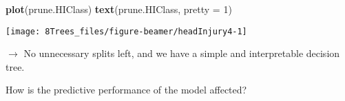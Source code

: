 \documentclass[10pt,ignorenonframetext,]{beamer}
\newenvironment{Shaded}{\begin{snugshade}}{\end{snugshade}}
\newcommand{\DataTypeTok}[1]{\textcolor[rgb]{0.13,0.29,0.53}{#1}}
\newcommand{\DecValTok}[1]{\textcolor[rgb]{0.00,0.00,0.81}{#1}}
\newcommand{\KeywordTok}[1]{\textcolor[rgb]{0.13,0.29,0.53}{\textbf{#1}}}
\newcommand{\NormalTok}[1]{#1}
\begin{document}
\begin{frame}[fragile]

\scriptsize

\begin{Shaded}
\begin{Highlighting}[]
\KeywordTok{plot}\NormalTok{(prune.HIClass)}
\KeywordTok{text}\NormalTok{(prune.HIClass, }\DataTypeTok{pretty =} \DecValTok{1}\NormalTok{)}
\end{Highlighting}
\end{Shaded}

\begin{center}\texttt{[image: 8Trees\_files/figure-beamer/headInjury4-1]} \end{center}

\normalsize

\(\rightarrow\) No unnecessary splits left, and we have a simple and
interpretable decision tree.

How is the predictive performance of the model affected?

\end{frame}
\end{document}
